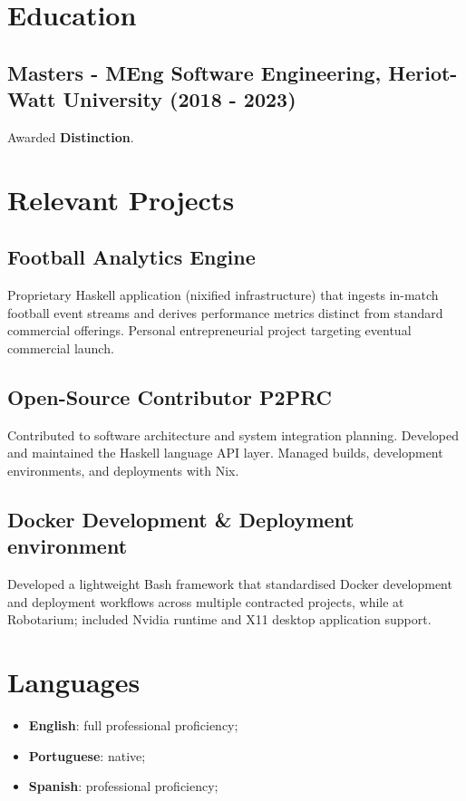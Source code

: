 ﻿\documentclass[11pt]{article}
\newcommand{\UList}[1]{
\begin{itemize}[leftmargin=*]
  #1
\end{itemize}
}
\newcommand{\Project}[3]{ \subsection{#1 #2} #3  }
\newcommand{\sectionTitle}[1]{\section{\color{titleGreen}#1}}
\begin{document}
\sectionTitle{Education}

\subsection{Masters - MEng Software Engineering, Heriot-Watt University (2018 - 2023)}

\noindent Awarded \textbf{Distinction}.


\sectionTitle{Relevant Projects}

\Project{Football Analytics Engine} { }
\noindent Proprietary Haskell application (nixified infrastructure) that ingests in-match football event streams and derives performance metrics distinct from standard commercial offerings. Personal entrepreneurial project targeting eventual commercial launch.

\Project{Open-Source Contributor  P2PRC} { }
\noindent Contributed to software architecture and system integration planning. Developed and maintained the Haskell language API layer. Managed builds, development environments, and deployments with Nix.

\Project{Docker Development \& Deployment environment} { }
\noindent Developed a lightweight Bash framework that standardised Docker development and deployment workflows across multiple contracted projects, while at Robotarium; included Nvidia runtime and X11 desktop application support.

\sectionTitle{Languages}
\UList{
  \item \textbf{English}: full professional proficiency;
  \item \textbf{Portuguese}: native;
  \item \textbf{Spanish}: professional proficiency;
}
\end{document}
